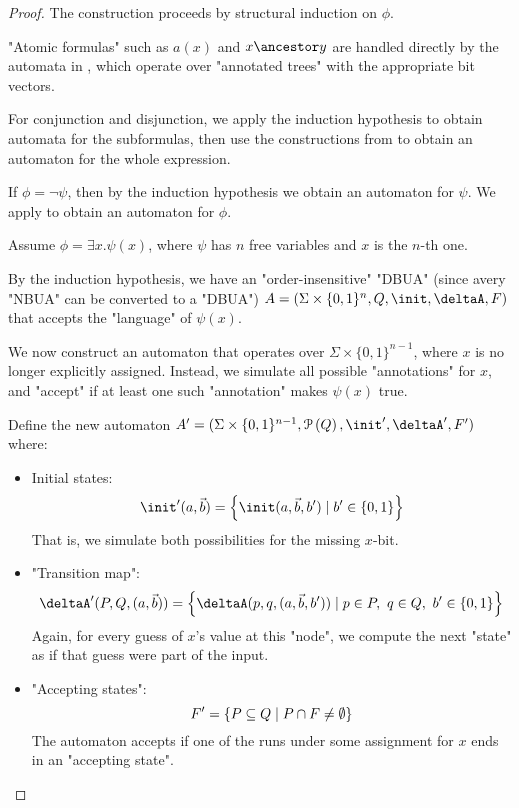 \documentclass[a4paper,UKenglish,cleveref, autoref, thm-restate]{lipics-v2021}
\begin{document}
\begin{proof}
	The construction proceeds by structural induction on $\phi$.

	"Atomic formulas" such as $a(x)$ and $x \ancestor y$ are handled directly by the automata
	in , which operate over "annotated trees" with the appropriate bit vectors.

	For conjunction and disjunction, we apply the induction hypothesis to obtain automata
	for the subformulas, then use the constructions from  to obtain an automaton for the whole expression.

	If $\phi = \lnot \psi$, then by the induction hypothesis we obtain an automaton for $\psi$. We apply
	 to obtain an automaton for $\phi$.

	Assume $\phi = \exists x.\psi(x)$, where $\psi$ has $n$ free variables and $x$ is the $n$-th one.

	By the induction hypothesis, we have an "order-insensitive" "DBUA" (since avery "NBUA" can be converted to a "DBUA")
	$A = (\Sigma \times \{0,1\}^n, Q, \init, \deltaA, F)$ that accepts the "language" of $\psi(x)$.

	We now construct an automaton that operates over $\Sigma \times \{0,1\}^{n-1}$, where $x$ is no longer explicitly assigned.
	Instead, we simulate all possible "annotations" for $x$, and "accept" if at least one such "annotation" makes $\psi(x)$ true.

	Define the new automaton $A' = (\Sigma \times \{0,1\}^{n-1}, \parts Q, \init', \deltaA', F')$ where:
	\begin{itemize}
		\item Initial states:
		      \[
			      \init'(a, \vec{b}) = \setdef{ \init(a, \vec{b}, b')} {b' \in \{0,1\} }
		      \]
		      That is, we simulate both possibilities for the missing $x$-bit.
		\item "Transition map":
		      \[
			      \deltaA'(P, Q, (a, \vec{b})) = \setdef{ \deltaA(p, q, (a, \vec{b}, b'))} {p \in P,\ q \in Q,\ b' \in \{0,1\} }
		      \]
		      Again, for every guess of $x$’s value at this "node", we compute the next "state" as if that guess were part of the input.
		\item "Accepting states":
		      \[
			      F' = \left\{ P \subseteq Q \mid P \cap F \neq \emptyset \right\}
		      \]
		      The automaton accepts if one of the runs under some assignment for $x$ ends in an "accepting state".
	\end{itemize}


\end{proof}
\end{document}
